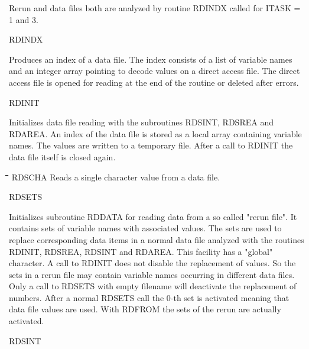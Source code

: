 \zerotestlastline
\begin{indenting}{2.54cm}
Rerun and data files both are analyzed by routine RDINDX called for
ITASK = 1 and 3.
\end{indenting}
RDINDX
\testlastline

\begin{indenting}{2.54cm}
Produces an index of a data file. The index consists of a list of variable
names and an integer array pointing to decode values on a direct access
file. The direct access file is opened for reading at the end of the routine or
deleted after errors.
\end{indenting}
RDINIT
\testlastline

\begin{indenting}{2.54cm}
Initializes data file reading with the subroutines RDSINT, RDSREA and
RDAREA. An index of the data file is stored as a local array containing
variable names. The values are written to a temporary file. After a call to
RDINIT the data file itself is closed again.
\end{indenting}
\begin{tabbing}
\hspace{1.27cm}\=\hspace{1.27cm}\=\hspace{1.27cm}\=\hspace{1.27cm}\=%
\hspace{1.27cm}\=\hspace{1.27cm}\=\hspace{1.27cm}\=\hspace{1.27cm}\=%
\hspace{1.27cm}\=\hspace{1.27cm}\=\kill
RDSCHA\> \> Reads a single character value from a data file.
\end{tabbing}

\bigskip
RDSETS
\testlastline

\begin{indenting}{2.54cm}
Initializes subroutine RDDATA for reading data from a so called "rerun
file". It contains sets of variable names with associated values. The sets are
used to replace corresponding data items in a normal data file analyzed
with the routines RDINIT, RDSREA, RDS\-INT and RDAREA. This facility
has a "global" character. A call to RDINIT does not disable the replace\-ment of values. So the sets in a rerun file may contain variable names
occurring in different data files. Only a call to RDSETS with empty
filename will deactivate the re\-placement of numbers. After a normal
RDSETS call the 0-th set is activated meaning that data file values are
used. With RDFROM the sets of the rerun are actually activated.
\end{indenting}
RDSINT
\testlastline

